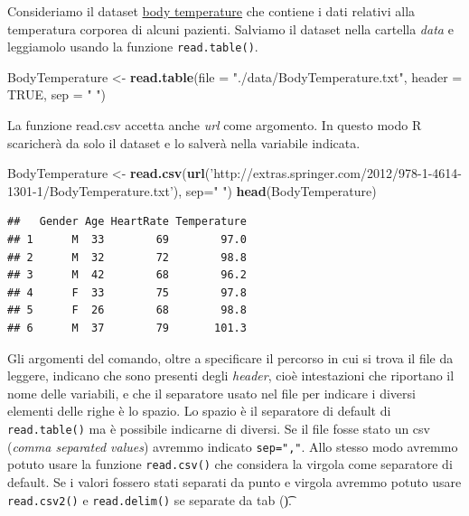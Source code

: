 \documentclass[]{book}
\newenvironment{Shaded}{\begin{snugshade}}{\end{snugshade}}
\newcommand{\DataTypeTok}[1]{\textcolor[rgb]{0.13,0.29,0.53}{#1}}
\newcommand{\KeywordTok}[1]{\textcolor[rgb]{0.13,0.29,0.53}{\textbf{#1}}}
\newcommand{\NormalTok}[1]{#1}
\newcommand{\OtherTok}[1]{\textcolor[rgb]{0.56,0.35,0.01}{#1}}
\newcommand{\StringTok}[1]{\textcolor[rgb]{0.31,0.60,0.02}{#1}}
\begin{document}
Consideriamo il dataset \href{http://extras.springer.com/2012/978-1-4614-1301-1}{body temperature} che contiene i dati relativi alla temperatura corporea di alcuni pazienti. Salviamo il dataset nella cartella \emph{data} e leggiamolo usando la funzione \texttt{read.table()}.

\begin{Shaded}
\begin{Highlighting}[]
\NormalTok{BodyTemperature <-}\StringTok{ }\KeywordTok{read.table}\NormalTok{(}\DataTypeTok{file =} \StringTok{"./data/BodyTemperature.txt"}\NormalTok{, }\DataTypeTok{header =} \OtherTok{TRUE}\NormalTok{, }\DataTypeTok{sep =} \StringTok{" "}\NormalTok{)}
\end{Highlighting}
\end{Shaded}

La funzione read.csv accetta anche \emph{url} come argomento. In questo modo R scaricherà da solo il dataset e lo salverà nella variabile indicata.

\begin{Shaded}
\begin{Highlighting}[]
\NormalTok{BodyTemperature <-}\StringTok{ }\KeywordTok{read.csv}\NormalTok{(}\KeywordTok{url}\NormalTok{(}\StringTok{'http://extras.springer.com/2012/978-1-4614-1301-1/BodyTemperature.txt'}\NormalTok{), }\DataTypeTok{sep=}\StringTok{" "}\NormalTok{)}
\KeywordTok{head}\NormalTok{(BodyTemperature)}
\end{Highlighting}
\end{Shaded}

\begin{verbatim}
##   Gender Age HeartRate Temperature
## 1      M  33        69        97.0
## 2      M  32        72        98.8
## 3      M  42        68        96.2
## 4      F  33        75        97.8
## 5      F  26        68        98.8
## 6      M  37        79       101.3
\end{verbatim}

Gli argomenti del comando, oltre a specificare il percorso in cui si trova il file da leggere, indicano che sono presenti degli \emph{header}, cioè intestazioni che riportano il nome delle variabili, e che il separatore usato nel file per indicare i diversi elementi delle righe è lo spazio. Lo spazio è il separatore di default di \texttt{read.table()} ma è possibile indicarne di diversi. Se il file fosse stato un csv (\emph{comma separated values}) avremmo indicato \texttt{sep=","}. Allo stesso modo avremmo potuto usare la funzione \texttt{read.csv()} che considera la virgola come separatore di default. Se i valori fossero stati separati da punto e virgola avremmo potuto usare \texttt{read.csv2()} e \texttt{read.delim()} se separate da tab (\t).
\end{document}
